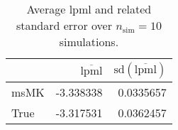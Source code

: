 \begin{table}[H]

\caption{Average lpml and related standard error over $n_{\text{sim}} = 10$ simulations.}
\centering
\begin{tabular}[t]{lrr}
\toprule
  & $\overbar{\text{lpml}}$ & $\text{sd}(\overbar{\text{lpml}})$\\
\midrule
msMK & -3.338338 & 0.0335657\\
True & -3.317531 & 0.0362457\\
\bottomrule
\end{tabular}
\end{table}